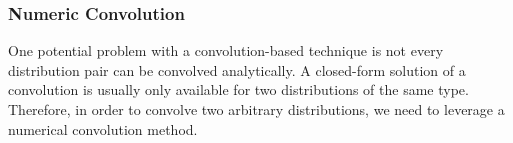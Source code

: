 \documentclass[10pt,sigconf,letterpaper,anonymous,nonacm]{acmart}
\begin{document}




\subsubsection{Numeric Convolution}
One potential problem with a convolution-based technique is not every distribution pair can be convolved 
analytically.
A closed-form solution of a convolution is usually only available for two distributions of the same type.
Therefore, in order to convolve two arbitrary distributions, we need to leverage a numerical convolution 
method.
\end{document}
